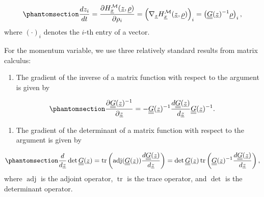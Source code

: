 \documentclass[
]{scrartcl}
\providecommand{\tightlist}{%
  \setlength{\itemsep}{0pt}\setlength{\parskip}{0pt}}\usepackage{longtable,booktabs,array}
\begin{document}
\begin{refsection}
\begin{equation}\phantomsection\label{eq-gradient-hamiltonian-position-rhmc}{
\frac{d z_i}{d t} = 
\frac{\partial H_{\underline{x}}^{\mathcal{M}}(\underline{z}, \underline{\rho})}
{
    \partial \rho_i
} = 
\left(
    \nabla_{\underline{z}} H_{\underline{x}}^{\mathcal{M}}
    (\underline{z}, \underline{\rho})
\right)_i = 
\left(
    \underline{\underline{G}}(\underline{z})^{-1} \underline{\rho}
\right)_i,
}\end{equation} where \(\left(\cdot\right)_i\) denotes the \(i\)-th
entry of a vector.

For the momentum variable, we use three relatively standard results from
matrix calculus:

\begin{enumerate}
\def\labelenumi{\arabic{enumi}.}
\tightlist
\item
  The gradient of the inverse of a matrix function with respect to the
  argument is given by
\end{enumerate}

\begin{equation}\phantomsection\label{eq-gradient-inverse-matrix}{
\frac{
    \partial \underline{\underline{G}}(\underline{z})^{-1}
}{
    \partial \underline{z}
} = 
-\underline{\underline{G}}(\underline{z})^{-1} 
\frac{d \underline{\underline{G}}(\underline{z})}{d \underline{z}} 
\underline{\underline{G}}(\underline{z})^{-1}.
}\end{equation}

\begin{enumerate}
\def\labelenumi{\arabic{enumi}.}
\setcounter{enumi}{1}
\tightlist
\item
  The gradient of the determinant of a matrix function with respect to
  the argument is given by
\end{enumerate}

\begin{equation}\phantomsection\label{eq-gradient-determinant-matrix}{
\frac{
    d
}{
    d \underline{z}
} \operatorname{det} \underline{\underline{G}}(\underline{z}) = 
\operatorname{tr}\left(
    \operatorname{adj}(\underline{\underline{G}}(\underline{z})) 
    \frac{d \underline{\underline{G}}(\underline{z})}{d \underline{z}}
\right) = 
\operatorname{det} \underline{\underline{G}}(\underline{z}) 
\operatorname{tr}\left(
    \underline{\underline{G}}(\underline{z})^{-1} 
    \frac{d \underline{\underline{G}}(\underline{z})}{d \underline{z}}
\right),
}\end{equation} where \(\operatorname{adj}\) is the adjoint operator,
\(\operatorname{tr}\) is the trace operator, and \(\operatorname{det}\)
is the determinant operator.


\end{refsection}
\end{document}

